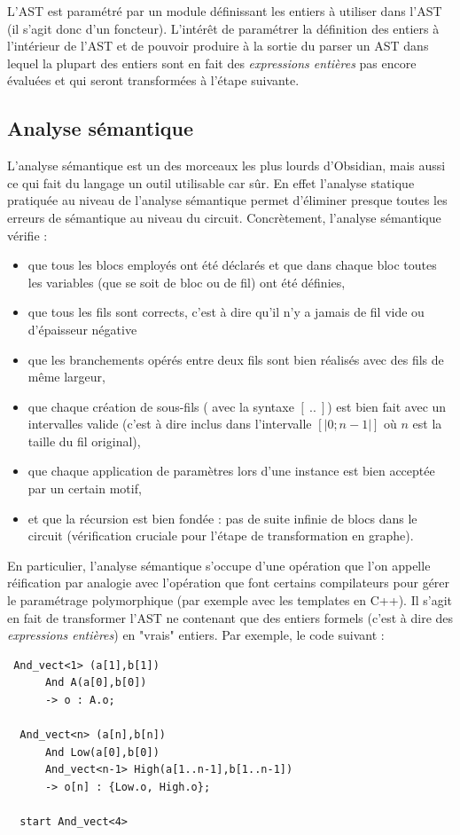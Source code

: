 \documentclass[13pt]{article}
\begin{document}
L'AST est paramétré par un module définissant les entiers à utiliser dans l'AST
(il s'agit donc d'un foncteur). L'intérêt de paramétrer la définition des
entiers à l'intérieur de l'AST et de pouvoir produire à la sortie du parser un
AST dans lequel la plupart des \og entiers\fg{} sont en fait des
\emph{expressions entières} pas encore évaluées et qui seront transformées à
l'étape suivante.

\subsection{Analyse sémantique}

L'analyse sémantique est un des morceaux les plus lourds d'Obsidian, mais aussi
ce qui fait du langage un outil utilisable car sûr. En effet l'analyse statique
pratiquée au niveau de l'analyse sémantique permet d'éliminer presque toutes les
erreurs de sémantique au niveau du circuit. Concrètement, l'analyse sémantique
vérifie :
\begin{itemize}
\item que tous les blocs employés ont été déclarés et que dans chaque bloc
  toutes les variables (que se soit de bloc ou de fil) ont été définies,
\item que tous les fils sont corrects, c'est à dire qu'il n'y a jamais de fil
  vide ou d'épaisseur négative 
\item que les branchements opérés entre deux fils sont bien réalisés avec des fils de 
  même largeur,
\item que chaque création de sous-fils ( avec la syntaxe $[\ ..\ ]$) est bien
  fait avec un intervalles valide (c'est à dire inclus dans l'intervalle $[| 0
  ; n - 1|]$ où $n$ est la taille du fil original),
\item que chaque application de paramètres lors d'une instance est bien
  acceptée par un certain motif,
\item et que la récursion est bien fondée : pas de suite infinie de
  blocs dans le circuit (vérification cruciale pour l'étape de
  transformation en graphe). 
\end{itemize}

En particulier, l'analyse sémantique s'occupe d'une opération que l'on appelle
réification par analogie avec l'opération que font certains compilateurs pour
gérer le paramétrage polymorphique (par exemple avec les templates en C++). Il
s'agit en fait de transformer l'AST ne contenant que des entiers \og
formels\fg{} (c'est à dire des \emph{expressions entières}) en "vrais" entiers.
Par exemple, le code suivant :
\begin{verbatim}
 And_vect<1> (a[1],b[1]) 
      And A(a[0],b[0])
      -> o : A.o;

  And_vect<n> (a[n],b[n])
      And Low(a[0],b[0])
      And_vect<n-1> High(a[1..n-1],b[1..n-1])
      -> o[n] : {Low.o, High.o};

  start And_vect<4>
\end{verbatim}
\end{document}
